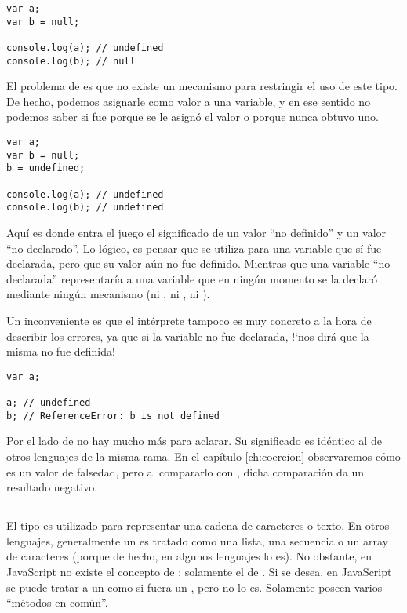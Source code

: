 \begin{lstlisting}[title={\code{null} y \code{undefined}}]
var a;
var b = null;

console.log(a);	// undefined
console.log(b);	// null
\end{lstlisting}

El problema de  es que no existe un mecanismo para restringir el uso de este tipo. De hecho, podemos asignarle  como valor a una variable, y en ese sentido no podemos saber si fue porque se le asignó el valor o porque nunca obtuvo uno.

\begin{lstlisting}
var a;
var b = null;
b = undefined;

console.log(a);	// undefined
console.log(b);	// undefined
\end{lstlisting}

Aquí es donde entra el juego el significado de un valor "`no definido"' y un valor "`no declarado"'. Lo lógico, es pensar que  se utiliza para una variable que sí fue declarada, pero que su valor aún no fue definido. Mientras que una variable "`no declarada"' representaría a una variable que en ningún momento se la declaró mediante ningún mecanismo (ni , ni , ni ).

Un inconveniente es que el intérprete tampoco es muy concreto a la hora de describir los errores, ya que si la variable no fue declarada, !`nos dirá que la misma no fue definida!

\begin{lstlisting}
var a;

a; // undefined
b; // ReferenceError: b is not defined
\end{lstlisting}

Por el lado de  no hay mucho más para aclarar. Su significado es idéntico al de otros lenguajes de la misma rama. En el capítulo \ref{ch:coercion} observaremos cómo  es un valor de falsedad, pero al compararlo con , dicha comparación da un resultado negativo.

\subsection{}

El tipo  es utilizado para representar una cadena de caracteres o texto. En otros lenguajes, generalmente un  es tratado como una lista, una secuencia o un array de caracteres (porque de hecho, en algunos lenguajes lo es). No obstante, en JavaScript no existe el concepto de ; solamente el de . Si se desea, en JavaScript se puede tratar a un  como si fuera un , pero no lo es. Solamente poseen varios "`métodos en común"'.

